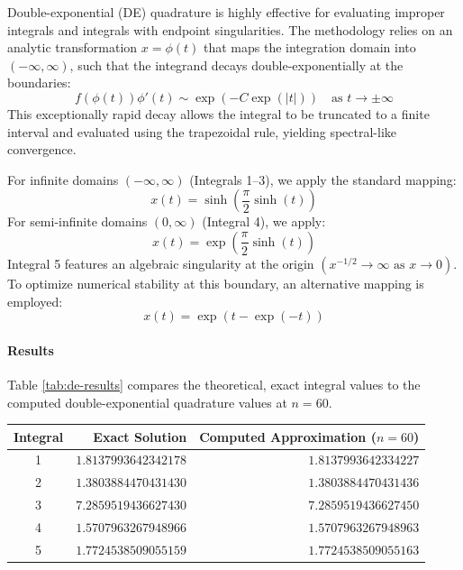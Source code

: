 \begin{solution}

	Double-exponential (DE) quadrature is highly effective for evaluating improper
	integrals and integrals with endpoint singularities. The methodology relies on
	an analytic transformation $x = \phi(t)$ that maps the integration domain into
	$(-\infty, \infty)$, such that the integrand decays double-exponentially at the
	boundaries:
	\[
		f(\phi(t)) \phi'(t) \sim \exp(-C \exp(|t|)) \quad \text{as } t \to \pm \infty
	\]
	This exceptionally rapid decay allows the integral to be truncated to a finite
	interval and evaluated using the trapezoidal rule, yielding spectral-like
	convergence.

	For infinite domains $(-\infty, \infty)$ (Integrals 1--3), we apply the
	standard mapping:
	\[
		x(t) = \sinh\left(\frac{\pi}{2} \sinh(t)\right)
	\]
	For semi-infinite domains $(0, \infty)$ (Integral 4), we apply:
	\[
		x(t) = \exp\left(\frac{\pi}{2} \sinh(t)\right)
	\]
	Integral 5 features an algebraic singularity at the origin $\left(x^{-1/2} \to
		\infty \text{ as } x \to 0\right)$. To optimize numerical stability at this
	boundary, an alternative mapping is employed:
	\[
		x(t) = \exp(t - \exp(-t))
	\]

	\paragraph{Results}
	Table \ref{tab:de-results} compares the theoretical, exact integral values to
	the computed double-exponential quadrature values at $n = 60$.

	\begin{center}
		\centering
		\label{tab:de-results}
		\renewcommand{\arraystretch}{1.2}
		\begin{tabular}{c r r}
			\toprule
			Integral & Exact Solution       & Computed Approximation ($n=60$) \\
			\midrule
			1        & $1.8137993642342178$ & $1.8137993642334227$            \\
			2        & $1.3803884470431430$ & $1.3803884470431436$            \\
			3        & $7.2859519436627430$ & $7.2859519436627450$            \\
			4        & $1.5707963267948966$ & $1.5707963267948963$            \\
			5        & $1.7724538509055159$ & $1.7724538509055163$            \\
			\bottomrule
		\end{tabular}
	\end{center}


\end{solution}
